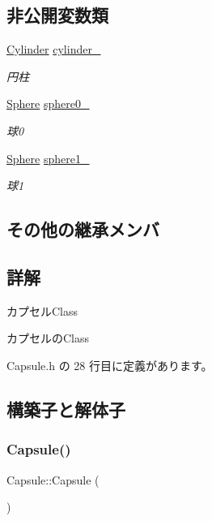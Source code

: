 \subsection*{非公開変数類}
\begin{DoxyCompactItemize}
\item 
\mbox{\hyperlink{class_cylinder}{Cylinder}} \mbox{\hyperlink{class_capsule_a7b7f46d36a0d810555aa5eb62da6a8ed}{cylinder\+\_\+}}
\begin{DoxyCompactList}\small\item\em 円柱 \end{DoxyCompactList}\item 
\mbox{\hyperlink{class_sphere}{Sphere}} \mbox{\hyperlink{class_capsule_a37c7db7fe8cb06be2f374d7aba24267e}{sphere0\+\_\+}}
\begin{DoxyCompactList}\small\item\em 球0 \end{DoxyCompactList}\item 
\mbox{\hyperlink{class_sphere}{Sphere}} \mbox{\hyperlink{class_capsule_ac478efc95993a85908a7cd2759133ab2}{sphere1\+\_\+}}
\begin{DoxyCompactList}\small\item\em 球1 \end{DoxyCompactList}\end{DoxyCompactItemize}
\subsection*{その他の継承メンバ}


\subsection{詳解}
カプセル\+Class 

カプセルの\+Class 

 Capsule.\+h の 28 行目に定義があります。



\subsection{構築子と解体子}
\mbox{\label{class_capsule_a4324279c9cc08241083b53c3a3dec44c}} 
\subsubsection{\texorpdfstring{Capsule()}{Capsule()}}
{\footnotesize\ttfamily Capsule\+::\+Capsule (\begin{DoxyParamCaption}{ }\end{DoxyParamCaption})}



